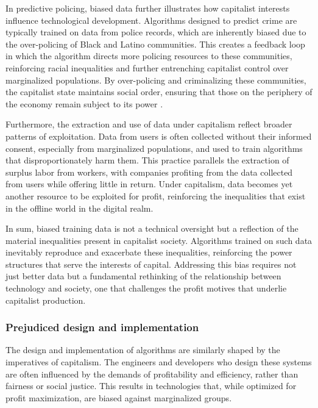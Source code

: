 \begin{refsection}
In predictive policing, biased data further illustrates how capitalist interests influence technological development. Algorithms designed to predict crime are typically trained on data from police records, which are inherently biased due to the over-policing of Black and Latino communities. This creates a feedback loop in which the algorithm directs more policing resources to these communities, reinforcing racial inequalities and further entrenching capitalist control over marginalized populations. By over-policing and criminalizing these communities, the capitalist state maintains social order, ensuring that those on the periphery of the economy remain subject to its power \cite[pp.~25-28]{benjamin2019}.

Furthermore, the extraction and use of data under capitalism reflect broader patterns of exploitation. Data from users is often collected without their informed consent, especially from marginalized populations, and used to train algorithms that disproportionately harm them. This practice parallels the extraction of surplus labor from workers, with companies profiting from the data collected from users while offering little in return. Under capitalism, data becomes yet another resource to be exploited for profit, reinforcing the inequalities that exist in the offline world in the digital realm.

In sum, biased training data is not a technical oversight but a reflection of the material inequalities present in capitalist society. Algorithms trained on such data inevitably reproduce and exacerbate these inequalities, reinforcing the power structures that serve the interests of capital. Addressing this bias requires not just better data but a fundamental rethinking of the relationship between technology and society, one that challenges the profit motives that underlie capitalist production.

\subsubsection{Prejudiced design and implementation}

The design and implementation of algorithms are similarly shaped by the imperatives of capitalism. The engineers and developers who design these systems are often influenced by the demands of profitability and efficiency, rather than fairness or social justice. This results in technologies that, while optimized for profit maximization, are biased against marginalized groups.


\end{refsection}
